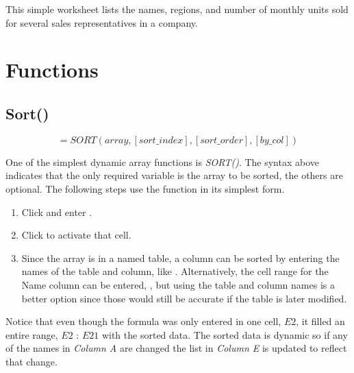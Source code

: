 This simple worksheet lists the names, regions, and number of monthly units sold for several sales representatives in a company. 

\section{Functions}

\subsection{Sort()}

\[ =SORT(array,[sort\_index],[sort\_order],[by\_col]) \]

One of the simplest dynamic array functions is \textit{SORT()}. The syntax above indicates that the only required variable is the array to be sorted, the others are optional. The following steps use the function in its simplest form.

\begin{enumbox}
	\begin{enumerate}
		\item Click  and enter .
		\item Click  to activate that cell.
		\item Since the array is in a named table, a column can be sorted by entering the names of the table and column, like . Alternatively, the cell range for the Name column can be entered, , but using the table and column names is a better option since those would still be accurate if the table is later modified.
	\end{enumerate}
\end{enumbox}

Notice that even though the formula was only entered in one cell, $ E2 $, it filled an entire range, $ E2 $ : $ E21 $ with the sorted data. The sorted data is dynamic so if any of the names in \textit{Column A} are changed the list in \textit{Column E} is updated to reflect that change.

